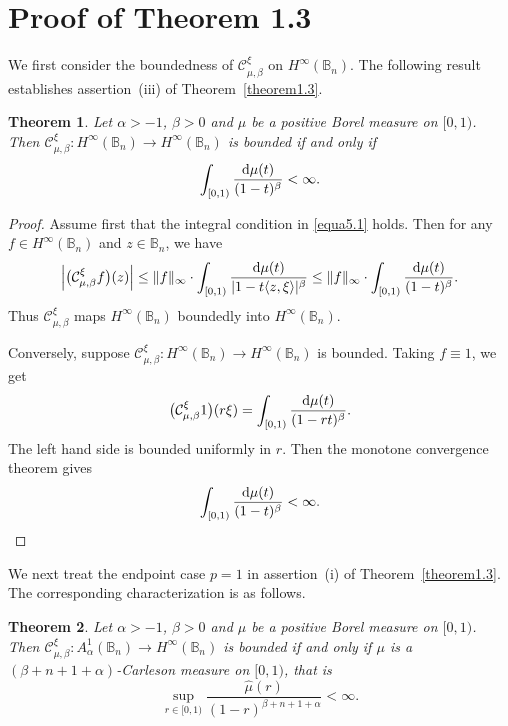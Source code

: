 \documentclass[preprint,12pt,times]{elsarticle}
\newtheorem{theorem}{Theorem}[section]
\theoremstyle{definition}
\theoremstyle{remark}
\numberwithin{equation}{section}
\begin{document}
\section{Proof of Theorem 1.3}

We first consider the boundedness of $\mathcal{C}_{\mu,\beta}^{\xi}$ on
$H^\infty(\mathbb{B}_n)$. The following result establishes assertion~{(iii)} of
Theorem~\ref{theorem1.3}.

\begin{theorem}\label{theorem5.1}
Let $\alpha>-1$, $\beta>0$ and $\mu$ be a positive Borel measure on $[0,1)$. Then $\mathcal C_{\mu,\beta}^{\xi}: H^{\infty}(\mathbb{B}_n)\to H^{\infty}(\mathbb{B}_n)$ is bounded if and only if 
\begin{equation}\label{equa5.1}
    \int_{[0,1)}\frac{{\rm d}\mu(t)}{(1-t)^{\beta}}<\infty.
\end{equation}
\end{theorem}

\begin{proof}
Assume first that the integral condition in \eqref{equa5.1} holds. Then for any $f\in H^{\infty}(\mathbb{B}_n)$ and $z\in\mathbb{B}_n$, we have
\begin{align*}
\left|\big(\mathcal{C}_{\mu,\beta}^{\xi}f\big)(z)\right|\leq \|f\|_{\infty}\cdot \int_{[0,1)}\frac{{\rm d}\mu(t)}{|1-t\langle z,\xi\rangle|^{\beta}}\leq \|f\|_{\infty}\cdot \int_{[0,1)}\frac{{\rm d}\mu(t)}{(1-t)^{\beta}}.
\end{align*}
Thus $\mathcal{C}_{\mu,\beta}^{\xi}$ maps $H^{\infty}(\mathbb{B}_n)$ boundedly into $H^{\infty}(\mathbb{B}_n)$.

Conversely, suppose $\mathcal{C}_{\mu,\beta}^{\xi}: H^{\infty}(\mathbb{B}_n)\to H^{\infty}(\mathbb{B}_n)$ is bounded. Taking $f\equiv 1$, we get
\[
    \big(\mathcal{C}_{\mu,\beta}^{\xi}1\big)(r\xi)=\int_{[0,1)}\frac{{\rm d}\mu(t)}{(1-rt)^{\beta}}.
\]
The left hand side is bounded uniformly in $r$. Then the monotone convergence theorem gives
\[
    \int_{[0,1)}\frac{{\rm d}\mu(t)}{(1-t)^{\beta}}<\infty.\qedhere
\]
\end{proof}

We next treat the endpoint case $p=1$ in assertion~{(i)} of
Theorem~\ref{theorem1.3}. The corresponding characterization is as follows.

\begin{theorem}\label{theorem5.2}
Let $\alpha>-1$, $\beta>0$ and $\mu$ be a positive Borel measure on $[0,1)$. Then $\mathcal C_{\mu,\beta}^{\xi}: A_{\alpha}^1(\mathbb{B}_n)\to H^{\infty}(\mathbb{B}_n)$ is bounded if and only if $\mu$ is a $(\beta+n+1+\alpha)$-Carleson measure on $[0,1)$, that is
\begin{equation}\label{equa5.0002}
    \sup_{r\in [0,1)}\frac{\hat{\mu}(r)}{(1-r)^{\beta+n+1+\alpha}}<\infty.
\end{equation}
\end{theorem}
\end{document}
